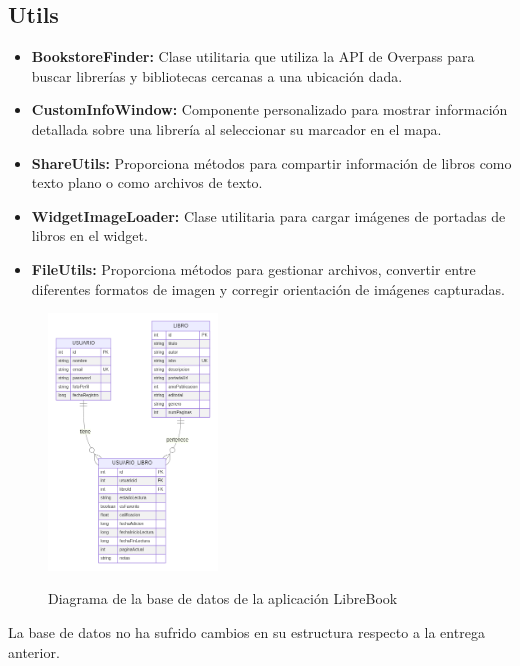 \documentclass[a4paper,11pt]{report}
\begin{document}
      \subsection{Utils}
        \begin{itemize}
          \item \textbf{BookstoreFinder:} Clase utilitaria que utiliza la API de Overpass para buscar librerías y bibliotecas cercanas a una ubicación dada.
          \item \textbf{CustomInfoWindow:} Componente personalizado para mostrar información detallada sobre una librería al seleccionar su marcador en el mapa.
          \item \textbf{ShareUtils:} Proporciona métodos para compartir información de libros como texto plano o como archivos de texto.
          \item \textbf{WidgetImageLoader:} Clase utilitaria para cargar imágenes de portadas de libros en el widget.
          \item \textbf{FileUtils:} Proporciona métodos para gestionar archivos, convertir entre diferentes formatos de imagen y corregir orientación de imágenes capturadas.
        \end{itemize}
      \begin{figure}[H]
        \centering
        \href{https://raw.githubusercontent.com/Xabierland/DAS-Proyecto/refs/heads/main/Documentation/Memoria2/.img/diagrama-bd.svg}{%
          \includegraphics[width=0.4\textwidth]{.img/diagrama-bd.png}
        }
        \caption{Diagrama de la base de datos de la aplicación LibreBook}
        \label{fig:diagrama-bd}
      \end{figure}
      La base de datos no ha sufrido cambios en su estructura respecto a la entrega anterior.
\end{document}
